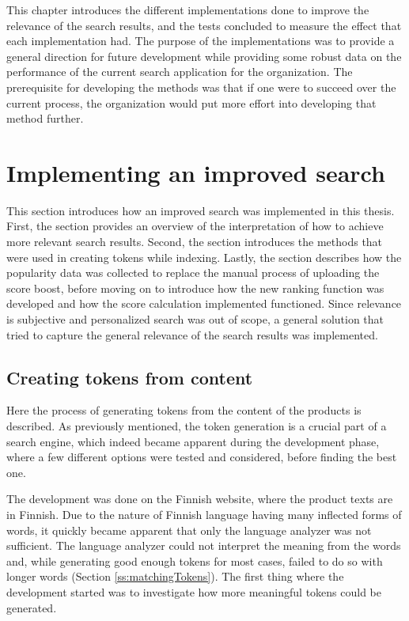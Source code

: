 
This chapter introduces the different implementations done to improve the relevance of the search results, and
the tests concluded to measure the effect that each implementation had.
The purpose of the implementations was to provide a general direction for future development 
while providing some robust data on the performance of the current search application for the organization.
The prerequisite for developing the methods was that if one were to succeed over the current
process, the organization would put more effort into developing that method further.



\section{Implementing an improved search}


This section introduces how an improved search was implemented in this thesis.
First, the section provides an overview of the interpretation of how to achieve more relevant search 
results.
Second, the section introduces the methods that were used in creating tokens while indexing.
Lastly, the section describes how the popularity data was collected to replace
the manual process of uploading the score boost, before moving on to introduce how
the new ranking function was developed and how the score calculation implemented functioned.
Since relevance is subjective and personalized search was out of scope,
a general solution that tried to capture the general relevance of the search results
was implemented.




\subsection{Creating tokens from content}
\label{ss:methodsTokens}


Here the process of generating tokens from the content of the products is described.
As previously mentioned, the token generation is a crucial part of a search engine, which indeed became
apparent during the development phase,
where a few different options were tested and considered, before finding the best one.


The development was done on the Finnish website, where the product texts are in Finnish.
Due to the nature of Finnish language having many inflected forms of words, 
it quickly became apparent that only the language analyzer was not sufficient.
The language analyzer could not interpret the meaning from the words and, 
while generating good enough tokens for most cases, failed to do so with longer words (Section \ref{ss:matchingTokens}).
The first thing where the development started was to investigate how more meaningful tokens could 
be generated.


